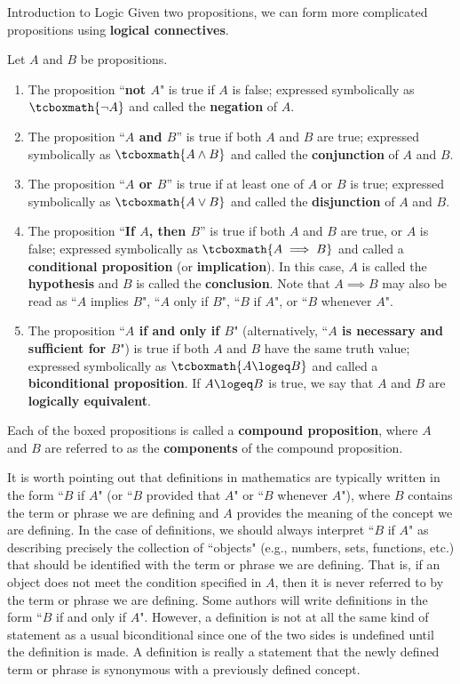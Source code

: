 \begin{section}{Introduction to Logic}
Given two propositions, we can form more complicated propositions using \textbf{logical connectives}.

\begin{definition}\label{def:logical connectives}
Let $A$ and $B$ be propositions.  
\begin{enumerate}[label=\textrm{(\alph*)}]
\item The proposition ``\textbf{not $A$}" is true if $A$ is false; expressed symbolically as 
$\tcboxmath{\neg A}$ and called the \textbf{negation} of $A$.
\item The proposition ``\textbf{$A$ and $B$}'' is true if both $A$ and $B$ are true; expressed symbolically as $\tcboxmath{A \wedge B}$ and called the \textbf{conjunction} of $A$ and $B$.
\item The proposition ``\textbf{$A$ or $B$}'' is true if at least one of $A$ or $B$ is true; expressed symbolically as $\tcboxmath{A \vee B}$ and called the \textbf{disjunction} of $A$ and $B$.
\item\label{def:conditional} The proposition ``\textbf{If $A$, then $B$}'' is true if both $A$ and $B$ are true, or $A$ is false; expressed symbolically as $\tcboxmath{A \implies B}$ and called a \textbf{conditional proposition} (or \textbf{implication}). In this case, $A$ is called the \textbf{hypothesis} and $B$ is called the \textbf{conclusion}. Note that $A \implies B$ may also be read as ``$A$ implies $B$", ``$A$ only if $B$", ``$B$ if $A$", or ``$B$ whenever $A$". 
\item\label{def:logically equivalent} The proposition ``\textbf{$A$ if and only if $B$}" (alternatively, ``\textbf{$A$ is necessary and sufficient for $B$}") is true if both $A$ and $B$ have the same truth value; expressed symbolically as $\tcboxmath{A\logeq B}$ and called a \textbf{biconditional proposition}. If $A\logeq B$ is true, we say that $A$ and $B$ are \textbf{logically equivalent}.
\end{enumerate}
Each of the boxed propositions is called a \textbf{compound proposition}, where $A$ and $B$ are referred to as the \textbf{components} of the compound proposition.
\end{definition}

It is worth pointing out that definitions in mathematics are typically written in the form ``$B$ if $A$" (or ``$B$ provided that $A$" or ``$B$ whenever $A$"), where $B$ contains the term or phrase we are defining and $A$ provides the meaning of the concept we are defining. In the case of definitions, we should always interpret ``$B$ if $A$" as describing precisely the collection of ``objects" (e.g., numbers, sets, functions, etc.) that should be identified with the term or phrase we are defining.  That is, if an object does not meet the condition specified in $A$, then it is never referred to by the term or phrase we are defining. Some authors will write definitions in the form ``$B$ if and only if $A$". However, a definition is not at all the same kind of statement as a usual biconditional since one of the two sides is undefined until the definition is made. A definition is really a statement that the newly defined term or phrase is synonymous with a previously defined concept.


\end{section}
